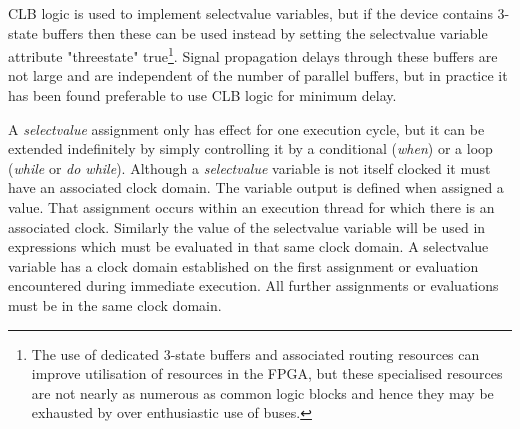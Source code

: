         CLB logic is used to implement selectvalue variables, but if the device
        contains 3-state buffers then these can be used instead by setting the
        selectvalue variable attribute "threestate" true\footnote{The use of
        dedicated 3-state buffers and associated routing resources can
        improve utilisation of resources in the FPGA, but these specialised
        resources are not nearly as numerous as common logic blocks and hence
        they may be exhausted by over enthusiastic use of buses.}. Signal
        propagation delays through these buffers are not large and are
        independent of the number of parallel buffers, but in practice it has
        been found preferable to use CLB logic for minimum delay.
        
        A {\em selectvalue} assignment only has effect for one execution
        cycle, but it can be extended indefinitely by simply controlling
        it by a conditional ({\em when}) or a loop ({\em while} or {\em do
        while}). Although a {\em selectvalue} variable is not itself
        clocked it must have an associated clock domain. The variable output
        is defined when assigned a value. That assignment occurs within an
        execution thread for which there is an associated clock. Similarly
        the value of the selectvalue variable will be used in expressions
        which must be evaluated in that same clock domain. A selectvalue
        variable has a clock domain established on the first assignment or
        evaluation encountered during immediate execution. All further
        assignments or evaluations must be in the same clock domain.
        
